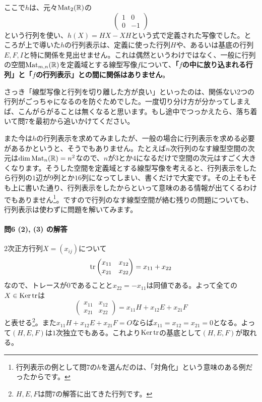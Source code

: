 ここで$h$は、元々$\operatorname{Mat}_2(\mathbb{R})$の
\[
\begin{pmatrix}
1 & 0 \\
0 & -1
\end{pmatrix}
\]
という行列を使い、$h(X) = HX - XH$という式で定義された写像でした。ところが上で導いた$h$の行列表示は、定義に使った行列$H$や、あるいは基底の行列$E, F, I$と特に関係を見出せません。これは偶然というわけではなく、一般に行列の空間$\operatorname{Mat}_{m, n}(\mathbb{R})$を定義域とする線型写像$f$について、\textbf{「$f$の中に放り込まれる行列」と「$f$の行列表示」との間に関係はありません}。

さっき「線型写像と行列を切り離した方が良い」といったのは、関係ない$2$つの行列がごっちゃになるのを防ぐためでした。一度切り分け方が分かってしまえば、こんがらがることは無くなると思います。もし途中でつっかえたら、落ち着いて問7を最初から追いかけてください。

また今は$h$の行列表示を求めてみましたが、一般の場合に行列表示を求める必要があるかというと、そうでもありません。たとえば$n$次行列のなす線型空間の次元は$\dim \operatorname{Mat}_n(\mathbb{R}) = n^2$なので、$n$が$3$とか$4$になるだけで空間の次元はすごく大きくなります。そうした空間を定義域とする線型写像を考えると、行列表示をしたら行列の$1$辺が$9$列とか$16$列になってしまい、書くだけで大変です。その上そもそも上に書いた通り、行列表示をしたからといって意味のある情報が出てくるわけでもありません\footnote{行列表示の例として問7の$h$を選んだのは、「対角化」という意味のある例だったからです。}。ですので行列のなす線型空間が絡む残りの問題についても、行列表示は使わずに問題を解いてみます。

\paragraph{問6 (2), (3) の解答} $2$次正方行列$X = (x_{ij})$について
\[
\operatorname{tr}
\begin{pmatrix}
x_{11} & x_{12} \\
x_{21} & x_{22}
\end{pmatrix}
= x_{11} + x_{22}
\]
なので、トレースが$0$であることと$x_{22} = -x_{11}$は同値である。よって全ての$X \in \operatorname{Ker} \operatorname{tr}$は
\[
\begin{pmatrix}
x_{11} & x_{12} \\
x_{21} & x_{22}
\end{pmatrix}
=
x_{11} H + x_{12} E + x_{21} F
\]
と表せる\footnote{$H, E, F$は問$7$の解答に出てきた行列です。}。また$x_{11} H + x_{12} E + x_{21} F = O$ならば$x_{11} = x_{12} = x_{21} = 0$となる。よって$(H, E, F)$は$1$次独立でもある。これより$\operatorname{Ker} \operatorname{tr}$の基底として$(H, E, F)$が取れる。

